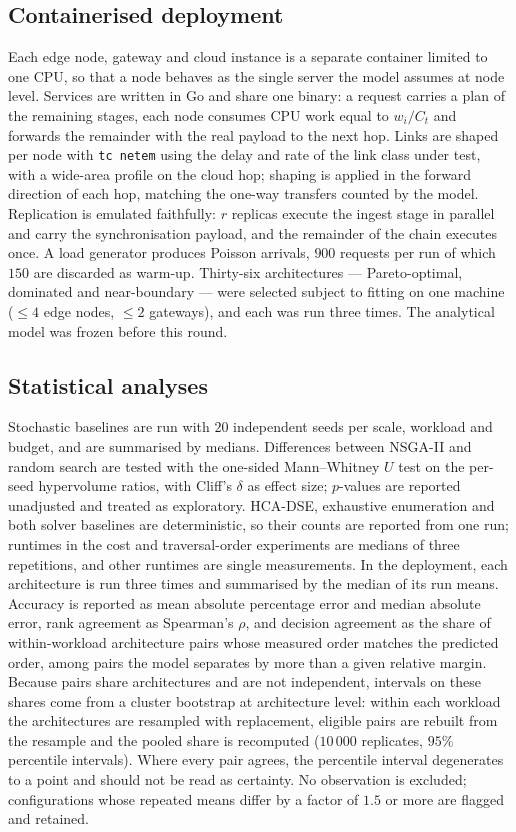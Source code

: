 \subsection{Containerised deployment}
Each edge node, gateway and cloud instance is a separate container limited to one CPU, so
that a node behaves as the single server the model assumes at node level. Services are
written in Go and share one binary: a request carries a plan of the remaining stages,
each node consumes CPU work equal to $w_i/C_t$ and forwards the remainder with the real
payload to the next hop. Links are shaped per node with \texttt{tc netem}
\cite{hemminger2005netem} using the delay and rate of the link class under test, with a
wide-area profile on the cloud hop; shaping is applied in the forward direction of each
hop, matching the one-way transfers counted by the model. Replication is emulated
faithfully: $r$ replicas execute the ingest stage in parallel and carry the
synchronisation payload, and the remainder of the chain executes once. A load generator
produces Poisson arrivals, $900$ requests per run of which $150$ are discarded as warm-up.
Thirty-six architectures --- Pareto-optimal, dominated and near-boundary --- were selected
subject to fitting on one machine ($\le4$ edge nodes, $\le2$ gateways), and each was run
three times. The analytical model was frozen before this round.

\subsection{Statistical analyses}
Stochastic baselines are run with $20$ independent seeds per scale, workload and budget,
and are summarised by medians. Differences between NSGA-II and random search are tested
with the one-sided Mann--Whitney $U$ test\cite{mann1947whitney} on the per-seed
hypervolume ratios, with Cliff's $\delta$\cite{cliff1993delta} as effect size;
$p$-values are reported unadjusted and treated as exploratory. HCA-DSE, exhaustive
enumeration and both solver baselines are deterministic, so their counts are reported
from one run; runtimes in the cost and traversal-order experiments are medians of three
repetitions, and other runtimes are single measurements. In the deployment, each architecture
is run three times and summarised by the median of its run means. Accuracy is reported as
mean absolute percentage error and median absolute error, rank agreement as Spearman's
$\rho$, and decision agreement as the share of within-workload architecture pairs whose
measured order matches the predicted order, among pairs the model separates by more than
a given relative margin. Because pairs share architectures and are not independent, intervals on these shares
come from a cluster bootstrap at architecture level: within each workload the
architectures are resampled with replacement, eligible pairs are rebuilt from the
resample and the pooled share is recomputed ($10\,000$ replicates, $95\%$ percentile
intervals). Where every pair agrees, the percentile interval degenerates to a point and
should not be read as certainty. No
observation is excluded; configurations whose repeated means differ by a factor of $1.5$
or more are flagged and retained.

